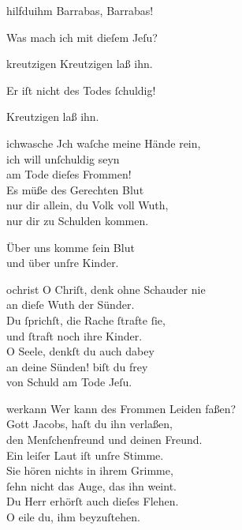 \documentclass[abbrwidth=6em,tocstyle=ref-genre,toe=false]{ees}
\begin{document}
{\begin{movement}{hilfduihm}
  Barrabas, Barrabas!

  \voice[Pilatus]
  Was mach ich mit dieſem Jeſu?
\end{movement}

\begin{movement}{kreutzigen}
  Kreutzigen laß ihn.

  \voice[Pilatus]
  Er iſt nicht des Todes ſchuldig!

  Kreutzigen laß ihn.
\end{movement}

\begin{movement}{ichwasche}
  \voice[Pilatus]
  Jch waſche meine Hände rein,\\
  ich will unſchuldig seyn\\
  am Tode dieſes Frommen!\\
  Es müße des Gerechten Blut\\
  nur dir allein, du Volk voll Wuth,\\
  nur dir zu Schulden kommen.

  Über uns komme ſein Blut\\
  und über unſre Kinder.
\end{movement}

\begin{movement}{ochrist}
  \voice[Chor]
  O Chriſt, denk ohne Schauder nie\\
  an dieſe Wuth der Sünder.\\
  Du ſprichſt, die Rache ſtrafte ſie,\\
  und ſtraft noch ihre Kinder.\\
  O Seele, denkſt du auch dabey\\
  an deine Sünden! biſt du frey\\
  von Schuld am Tode Jeſu.
\end{movement}

\begin{movement}{werkann}
  Wer kann des Frommen Leiden faßen?\\
  Gott Jacobs, haſt du ihn verlaßen,\\
  den Menſchenfreund und deinen Freund.\\
  Ein leiſer Laut iſt unſre Stimme.\\
  Sie hören nichts in ihrem Grimme,\\
  ſehn nicht das Auge, das ihn weint.\\
  Du Herr erhörſt auch dieſes Flehen.\\
  O eile du, ihm beyzuſtehen.
\end{movement}

}
\end{document}
